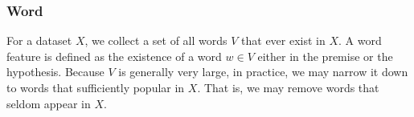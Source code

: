 \subsubsection{Word} 
For a dataset $X$, we collect a set of all words 
$V$ that ever exist in $X$. 
A word feature is defined as the existence of a word $w \in V$
either in the premise or the hypothesis. 
Because $V$ is generally very large, in practice, we may narrow it down
to words that sufficiently popular in $X$. That is, we may remove
words that seldom appear in $X$.
%

%

